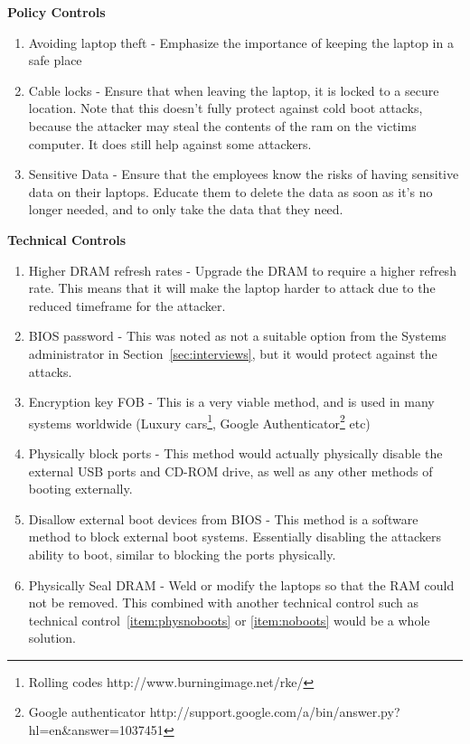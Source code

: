 \documentclass{article}
\numberwithin{equation}{section} %
\numberwithin{figure}{section} %
\numberwithin{table}{section} %
\begin{document}
\textbf{Policy Controls}
\label{sec:controls}
	\begin{enumerate}
		\item Avoiding laptop theft - Emphasize the importance of keeping the laptop in a safe place
		\item Cable locks - Ensure that when leaving the laptop, it is locked to a secure location.  Note that this doesn't fully protect against cold boot attacks, because the attacker may steal the contents of the ram on the victims computer.  It does still help against some attackers.
		\item Sensitive Data - Ensure that the employees know the risks of having sensitive data on their laptops.  Educate them to delete the data as soon as it's no longer needed, and to only take the data that they need.
	\end{enumerate}
	\newpage
	\textbf{Technical Controls}
	\begin{enumerate}
		\item Higher DRAM refresh rates - Upgrade the DRAM to require a higher refresh rate.  This means that it will make the laptop harder to attack due to the reduced timeframe for the attacker.
		\item BIOS password - This was noted as not a suitable option from the Systems administrator in Section~\ref{sec:interviews}, but it would protect against the attacks.
		\item Encryption key FOB - This is a very viable method, and is used in many systems worldwide (Luxury cars\footnote{Rolling codes http://www.burningimage.net/rke/}, Google Authenticator\footnote{Google authenticator http://support.google.com/a/bin/answer.py?hl=en\&answer=1037451} etc)
		\item Physically block ports - This method would actually physically disable the external USB ports and CD-ROM drive, as well as any other methods of booting externally. \label{item:physnoboots}
		\item Disallow external boot devices from BIOS - This method is a software method to block external boot systems.  Essentially disabling the attackers ability to boot, similar to blocking the ports physically. \label{item:noboots}
		\item Physically Seal DRAM - Weld or modify the laptops so that the RAM could not be removed.    This combined with another technical control such as technical control~\ref{item:physnoboots} or \ref{item:noboots} would be a whole solution.
	\end{enumerate}
\end{document}
